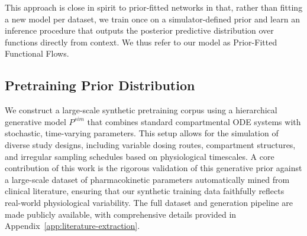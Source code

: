 This approach is close in spirit to prior-fitted networks in that, rather than fitting a new model per dataset, we train once on a simulator-defined prior and learn an inference procedure that outputs the posterior predictive distribution over functions directly from context. 
We thus refer to our model as Prior-Fitted Functional Flows.
\subsection{Pretraining Prior Distribution}
\label{sec:pretraining-prior}
We construct a large-scale synthetic pretraining corpus using a hierarchical generative model $P^{sim}$ that combines standard compartmental ODE systems with stochastic, time-varying parameters. This setup allows for the simulation of diverse study designs, including variable dosing routes, compartment structures, and irregular sampling schedules based on physiological timescales. A core contribution of this work is the rigorous validation of this generative prior against a large-scale dataset of pharmacokinetic parameters automatically mined from clinical literature, ensuring that our synthetic training data faithfully reflects real-world physiological variability. The full dataset and generation pipeline are made publicly available, with comprehensive details provided in Appendix~\ref{app:literature-extraction}.




